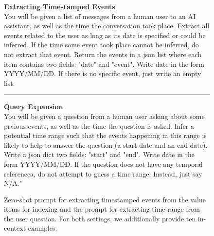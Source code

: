 \begin{figure}[htb]
    \begin{tcolorbox}
    \textbf{Extracting Timestamped Events} \\

    You will be given a list of messages from a human user to an AI assistant, as well as the time the conversation took place. Extract all events related to the user as long as its date is specified or could be inferred. If the time some event took place cannot be inferred, do not extract that event. Return the events in a json list where each item contains two fields: "date" and "event". Write date in the form YYYY/MM/DD. If there is no specific event, just write an empty list. \\

    \hrule
    \bigskip
    
    \textbf{Query Expansion} \\

    You will be given a question from a human user asking about some prvious events, as well as the time the question is asked. Infer a potential time range such that the events happening in this range is likely to help to answer the question (a start date and an end date). Write a json dict two fields: "start" and "end". Write date in the form YYYY/MM/DD. If the question does not have any temporal referencea, do not attempt to guess a time range. Instead, just say N/A."
    
    \end{tcolorbox}
    \caption{Zero-shot prompt for extracting timestamped events from the value items for indexing and the prompt for extracting time range from the user question. For both settings, we additionally provide ten in-context examples.}
    \label{fig:temporal-query-prompt}
\end{figure}
